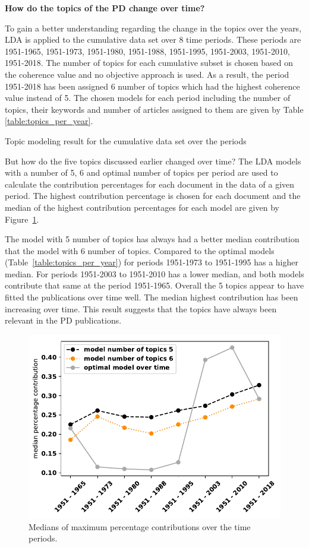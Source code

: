 \documentclass{article}
\theoremstyle{definition}
\begin{document}
\textbf{How do the topics of the PD change over time?}

To gain a better understanding regarding the change in the topics over the years,
LDA is applied to the cumulative data set over 8 time periods. These periods are
1951-1965, 1951-1973, 1951-1980, 1951-1988, 1951-1995, 1951-2003, 1951-2010,
1951-2018. The number of topics for each cumulative subset is chosen based on
the coherence value and no objective approach is used. As a result, the period
1951-2018 has been assigned 6 number of topics which had the highest coherence
value instead of 5. The chosen models for each period including the
number of topics, their keywords and number of articles assigned to them are
given by Table \ref{table:topics_per_year}.

\begin{table}[!hbtp]
    \begin{center}
    \resizebox{\textwidth}{!}{
    }
    \end{center}
    \caption{Topic modeling result for the cumulative data set over the periods
    }\label{table:topics_per_year}
\end{table}

But how do the five topics discussed earlier changed over time? The LDA models
with a number of 5, 6 and optimal number of topics per period are used to
calculate the contribution percentages for each document in the data of a given
period. The highest contribution percentage is chosen for each document and the
median of the highest contribution percentages for each model are given by
Figure~\ref{fig:median_percentage_contribution_over_time}.

The model with 5 number of topics has always had a better median contribution
that the model with 6 number of topics. Compared to the optimal models 
(Table~\ref{table:topics_per_year}) for periods 1951-1973 to 1951-1995
has a higher median. For periods 1951-2003 to 1951-2010 has a lower median, and
both models contribute that same at the period 1951-1965. Overall the 5 topics
appear to have fitted the publications over time well. The median highest
contribution has been increasing over time. This result suggests that the
topics have always been relevant in the PD publications.

\begin{figure}[!hbtp]
    \centering
    \includegraphics[width=.45\textwidth]{./assets/images/contribution_over_time.pdf}
    \caption{Medians of maximum percentage contributions over the time periods.}
    \label{fig:median_percentage_contribution_over_time}
\end{figure}
\end{document}

